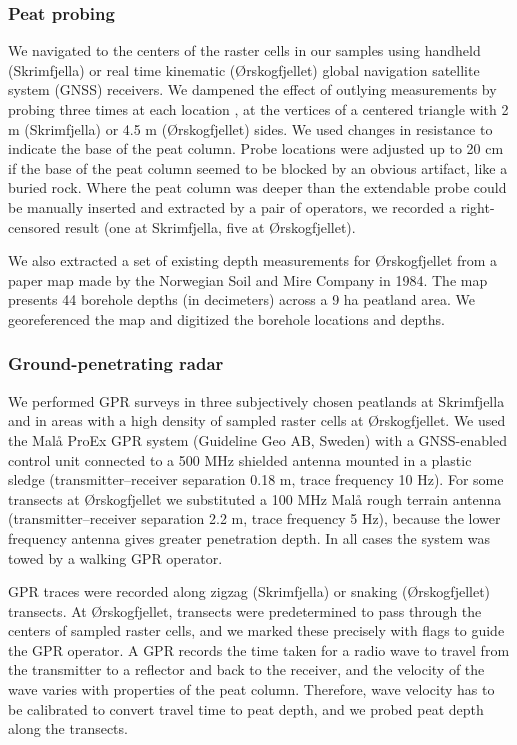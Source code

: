\documentclass[soil, manuscript]{copernicus}
\begin{document}
\subsubsection{Peat probing}

We navigated to the centers of the raster cells in our samples using handheld (Skrimfjella) or real time kinematic (Ørskogfjellet) global navigation satellite system (GNSS) receivers.
We dampened the effect of outlying measurements by probing three times at each location \citep{parryEvaluatingApproachesEstimating2014}, at the vertices of a centered triangle with 2 m (Skrimfjella) or 4.5 m (Ørskogfjellet) sides.
We used changes in resistance to indicate the base of the peat column.
Probe locations were adjusted up to 20 cm if the base of the peat column seemed to be blocked by an obvious artifact, like a buried rock.
Where the peat column was deeper than the extendable probe could be manually inserted and extracted by a pair of operators, we recorded a right-censored result (one at Skrimfjella, five at Ørskogfjellet).

We also extracted a set of existing depth measurements for Ørskogfjellet from a paper map made by the Norwegian Soil and Mire Company in 1984.
The map presents 44 borehole depths (in decimeters) across a 9 ha peatland area.
We georeferenced the map and digitized the borehole locations and depths.

\subsubsection{Ground-penetrating radar}

We performed GPR surveys in three subjectively chosen peatlands at Skrimfjella and in areas with a high density of sampled raster cells at Ørskogfjellet.
We used the Malå ProEx GPR system (Guideline Geo AB, Sweden) with a GNSS-enabled control unit connected to a 500 MHz shielded antenna mounted in a plastic sledge (transmitter--receiver separation 0.18 m, trace frequency 10 Hz).
For some transects at Ørskogfjellet we substituted a 100 MHz Malå rough terrain antenna (transmitter--receiver separation 2.2 m, trace frequency 5 Hz), because the lower frequency antenna gives greater penetration depth.
In all cases the system was towed by a walking GPR operator.

GPR traces were recorded along zigzag (Skrimfjella) or snaking (Ørskogfjellet) transects.
At Ørskogfjellet, transects were predetermined to pass through the centers of sampled raster cells, and we marked these precisely with flags to guide the GPR operator.
A GPR records the time taken for a radio wave to travel from the transmitter to a reflector and back to the receiver, and the velocity of the wave varies with properties of the peat column.
Therefore, wave velocity has to be calibrated to convert travel time to peat depth, and we probed peat depth along the transects.
\end{document}

